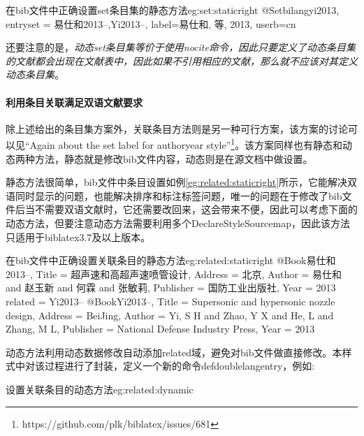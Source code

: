 \begin{codetex}{在bib文件中正确设置set条目集的静态方法}{eg:set:staticright}
@Set{bilangyi2013,
entryset = {易仕和2013--,Yi2013--},
label={易仕和, 等, 2013},
userb={cn}
}
\end{codetex}

还要注意的是，\emph{动态set条目集等价于使用nocite命令，因此只要定义了动态条目集的文献都会出现在文献表中，因此如果不引用相应的文献，那么就不应该对其定义动态条目集}。

\paragraph{利用条目关联满足双语文献要求}

除上述给出的条目集方案外，关联条目方法则是另一种可行方案，该方案的讨论可以见“Again about the \@ set label for authoryear style”\footnote{https://github.com/plk/biblatex/issues/681}。该方案同样也有静态和动态两种方法，静态就是修改bib文件内容，动态则是在源文档中做设置。

静态方法很简单，bib文件中条目设置如例\ref{eg:related:staticright}所示，它能解决双语同时显示的问题，也能解决排序和标注标签问题，唯一的问题在于修改了bib文件后当不需要双语文献时，它还需要改回来，这会带来不便，因此可以考虑下面的动态方法，但要注意动态方法需要利用多个DeclareStyleSourcemap，因此该方法只适用于biblatex3.7及以上版本。

\begin{codetex}{在bib文件中正确设置关联条目的静态方法}{eg:related:staticright}
@Book{易仕和2013--,
  Title                    = {超声速和高超声速喷管设计},
  Address                  = {北京},
  Author                   = {易仕和 and 赵玉新 and 何霖 and 张敏莉},
  Publisher                = {国防工业出版社},
  Year                     = {2013}
  related                  = {Yi2013--}
}
@Book{Yi2013--,
  Title                    = {Supersonic and hypersonic nozzle design},
  Address                  = {BeiJing},
  Author                   = {Yi, S H and Zhao, Y X and He, L and Zhang, M L},
  Publisher                = {National Defense Industry Press},
  Year                     = {2013}
}
\end{codetex}

动态方法利用动态数据修改自动添加related域，避免对bib文件做直接修改。本样式中对该过程进行了封装，定义一个新的命令defdoublelangentry，例如:
\begin{codetex}{设置关联条目的动态方法}{eg:related:dynamic}
\end{codetex}

